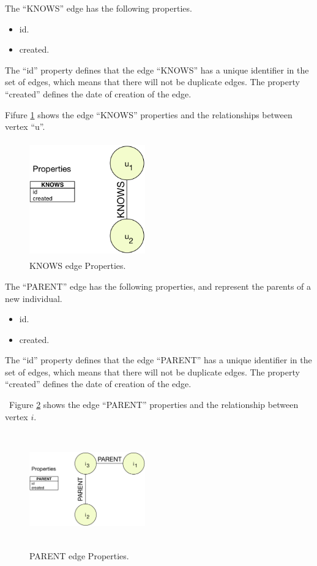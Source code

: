 The “KNOWS” edge has the following properties.
\begin{itemize}
\item id.
\item created.
\end{itemize}

The “id” property defines that the edge “KNOWS” has a unique identifier in the
set of edges, which means that there will not be duplicate edges. The property
“created” defines the date of creation of the edge.

Fifure \ref{fig:Knows_edge} shows the edge “KNOWS” properties and the relationships between vertex “u”.

\begin{figure}
\captionsetup{justification=centering,margin=2cm}
\centering
\setlength\fboxsep{0pt}
\setlength\fboxrule{0.7pt}
\includegraphics[width=5cm,height=5cm,keepaspectratio]{img/edge_properties_knows.png}
\caption{KNOWS edge Properties.}
\label{fig:Knows_edge}
\end{figure}

The “PARENT” edge has the following properties, and represent the parents of a
new individual.
\begin{itemize}
\item id.
\item created.
\end{itemize}

The “id” property defines that the edge “PARENT” has a unique identifier in the
set of edges, which means that there will not be duplicate edges. The property
“created” defines the date of creation of the edge.

~Figure \ref{fig:Parent_edge} shows the edge “PARENT” properties and the
relationship between vertex $i$.

\begin{figure}
\captionsetup{justification=centering,margin=2cm}
\centering
\setlength\fboxsep{0pt}
\setlength\fboxrule{0.7pt}
\includegraphics[width=5cm,height=5cm,keepaspectratio]{img/edge_properties_parent.png}
\caption{PARENT edge Properties.}
\label{fig:Parent_edge}
\end{figure}

